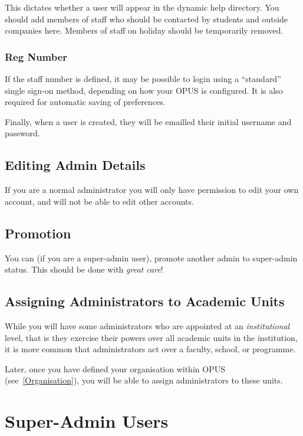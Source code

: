 \documentclass[12 pt]{book}
\begin{document}
This dictates whether a user will appear in the dynamic help directory. You
should add members of staff who should be contacted by students and outside
companies here. Members of staff on holiday should be temporarily removed.

\subsubsection{Reg Number}

If the staff number is defined, it may be possible to login using a ``standard''
single sign-on method, depending on how your OPUS is configured. It is also
required for automatic saving of preferences.

Finally, when a user is created, they will be emailled their
initial username and password.

\subsection{Editing Admin Details}

If you are a normal administrator you will only have permission to edit your own
account, and will not be able to edit other accounts.


\subsection{Promotion}

You can (if you are a super-admin user), promote another admin to super-admin
status. This should be done with \emph{great care}!

\subsection{Assigning Administrators to Academic Units}

While you will have some administrators who are appointed at an \emph{institutional}
level, that is they exercise their powers over all academic units in the institution,
it is more common that administrators act over a faculty, school, or programme.

Later, once you have defined your organisation within OPUS (see~\ref{Organisation}),
you will be able to assign administrators to these units.

\section{Super-Admin Users}
\end{document}
